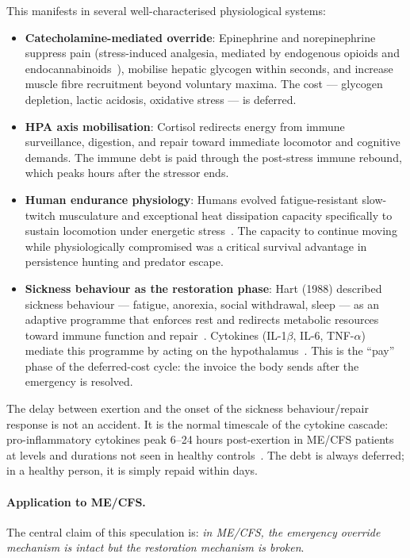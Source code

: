 \begin{speculation}
This manifests in several well-characterised physiological systems:
\begin{itemize}
  \item \textbf{Catecholamine-mediated override}: Epinephrine and norepinephrine suppress pain
    (stress-induced analgesia, mediated by endogenous opioids and endocannabinoids~\cite{Parikh2011StressAnalgesia}),
    mobilise hepatic glycogen within seconds, and increase muscle fibre recruitment beyond
    voluntary maxima. The cost --- glycogen depletion, lactic acidosis, oxidative stress ---
    is deferred.
  \item \textbf{HPA axis mobilisation}: Cortisol redirects energy from immune surveillance,
    digestion, and repair toward immediate locomotor and cognitive demands. The immune debt
    is paid through the post-stress immune rebound, which peaks hours after the stressor ends.
  \item \textbf{Human endurance physiology}: Humans evolved fatigue-resistant slow-twitch
    musculature and exceptional heat dissipation capacity specifically to sustain locomotion
    under energetic stress~\cite{Bramble2004EnduranceRunning,Marino2022FatigueEvolution}.
    The capacity to continue moving while physiologically compromised was a critical survival
    advantage in persistence hunting and predator escape.
  \item \textbf{Sickness behaviour as the restoration phase}: Hart (1988) described sickness
    behaviour --- fatigue, anorexia, social withdrawal, sleep --- as an adaptive programme
    that enforces rest and redirects metabolic resources toward immune function and
    repair~\cite{Hart1988SickBehavior}. Cytokines (IL-1$\beta$, IL-6, TNF-$\alpha$) mediate
    this programme by acting on the hypothalamus~\cite{Dantzer2007SicknessBehavior}. This is
    the ``pay'' phase of the deferred-cost cycle: the invoice the body sends after the emergency
    is resolved.
\end{itemize}

The delay between exertion and the onset of the sickness behaviour/repair response is not
an accident. It is the normal timescale of the cytokine cascade: pro-inflammatory cytokines
peak 6--24 hours post-exertion in ME/CFS patients at levels and durations not seen in healthy
controls~\cite{Che2025}. The debt is always deferred; in a healthy person,
it is simply repaid within days.

\paragraph{Application to ME/CFS.}
The central claim of this speculation is: \emph{in ME/CFS, the emergency override mechanism
is intact but the restoration mechanism is broken}.


\end{speculation}

